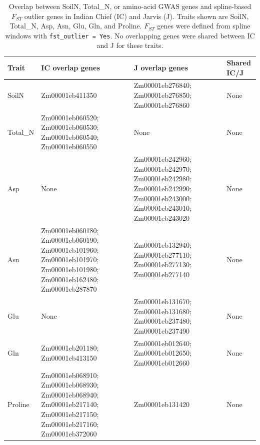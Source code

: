 \begin{table}[ht]
\centering
\scriptsize
\caption{Overlap between SoilN, Total\_N, or amino-acid GWAS genes and spline-based $F_{ST}$ outlier genes in Indian Chief (IC) and Jarvis (J). Traits shown are SoilN, Total\_N, Asp, Asn, Glu, Gln, and Proline. $F_{ST}$ genes were defined from spline windows with \texttt{fst\_outlier = Yes}. No overlapping genes were shared between IC and J for these traits.}
\label{tab:fst_gwas_overlap_ic_j}
\begin{tabular}{p{1.6cm}p{5.9cm}p{5.9cm}p{1.7cm}}
\hline
Trait & IC overlap genes & J overlap genes & Shared IC/J \\
\hline
SoilN & Zm00001eb411350 & Zm00001eb276840; Zm00001eb276850; Zm00001eb276860 & None \\
Total\_N & Zm00001eb060520; Zm00001eb060530; Zm00001eb060540; Zm00001eb060550 & None & None \\
Asp & None & Zm00001eb242960; Zm00001eb242970; Zm00001eb242980; Zm00001eb242990; Zm00001eb243000; Zm00001eb243010; Zm00001eb243020 & None \\
Asn & Zm00001eb060180; Zm00001eb060190; Zm00001eb101960; Zm00001eb101970; Zm00001eb101980; Zm00001eb162480; Zm00001eb287870 & Zm00001eb132940; Zm00001eb277110; Zm00001eb277130; Zm00001eb277140 & None \\
Glu & None & Zm00001eb131670; Zm00001eb131680; Zm00001eb237480; Zm00001eb237490 & None \\
Gln & Zm00001eb201180; Zm00001eb413150 & Zm00001eb012640; Zm00001eb012650; Zm00001eb012660 & None \\
Proline & Zm00001eb068910; Zm00001eb068930; Zm00001eb068940; Zm00001eb217140; Zm00001eb217150; Zm00001eb217160; Zm00001eb372060 & Zm00001eb131420 & None \\
\hline
\end{tabular}
\end{table}
